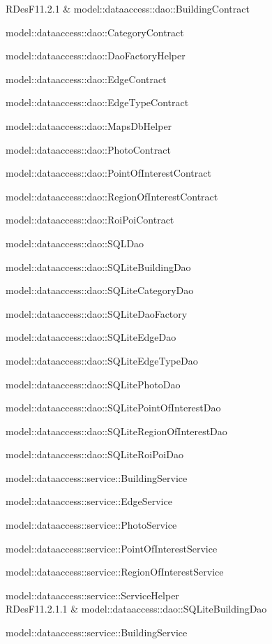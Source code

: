 \documentclass[../DefinizioneDiProdotto.tex]{subfiles}
\begin{document}
\begin{longtabu}
\midrule 
RDesF11.2.1 & model::\-dataaccess::\-dao::\-BuildingContract \par model::\-dataaccess::\-dao::\-CategoryContract \par model::\-dataaccess::\-dao::\-DaoFactoryHelper \par model::\-dataaccess::\-dao::\-EdgeContract \par model::\-dataaccess::\-dao::\-EdgeTypeContract \par model::\-dataaccess::\-dao::\-MapsDbHelper \par model::\-dataaccess::\-dao::\-PhotoContract \par model::\-dataaccess::\-dao::\-PointOfInterestContract \par model::\-dataaccess::\-dao::\-RegionOfInterestContract \par model::\-dataaccess::\-dao::\-RoiPoiContract \par model::\-dataaccess::\-dao::\-SQLDao \par model::\-dataaccess::\-dao::\-SQLiteBuildingDao \par model::\-dataaccess::\-dao::\-SQLiteCategoryDao \par model::\-dataaccess::\-dao::\-SQLiteDaoFactory \par model::\-dataaccess::\-dao::\-SQLiteEdgeDao \par model::\-dataaccess::\-dao::\-SQLiteEdgeTypeDao \par model::\-dataaccess::\-dao::\-SQLitePhotoDao \par model::\-dataaccess::\-dao::\-SQLitePointOfInterestDao \par model::\-dataaccess::\-dao::\-SQLiteRegionOfInterestDao \par model::\-dataaccess::\-dao::\-SQLiteRoiPoiDao \par model::\-dataaccess::\-service::\-BuildingService \par model::\-dataaccess::\-service::\-EdgeService \par model::\-dataaccess::\-service::\-PhotoService \par model::\-dataaccess::\-service::\-PointOfInterestService \par model::\-dataaccess::\-service::\-RegionOfInterestService \par model::\-dataaccess::\-service::\-ServiceHelper \\ 
\midrule 
RDesF11.2.1.1 & model::\-dataaccess::\-dao::\-SQLiteBuildingDao \par model::\-dataaccess::\-service::\-BuildingService \\ 

\end{longtabu}
\end{document}
